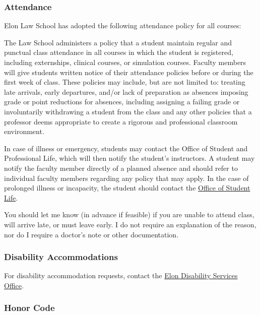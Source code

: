 \documentclass[11pt,letterpaper,twoside]{article}
\renewenvironment{quote}{%
   \list{}{%
     \leftmargin2em   %
     \rightmargin\leftmargin\parsep .1em }
   \item\relax
}
{\endlist}
\begin{document}
\subsubsection{Attendance}\label{attendance}

Elon Law School has adopted the following attendance policy for all
courses:

\begin{quote}
The Law School administers a policy that a student maintain regular and
punctual class attendance in all courses in which the student is
registered, including externships, clinical courses, or simulation
courses. Faculty members will give students written notice of their
attendance policies before or during the first week of class. These
policies may include, but are not limited to: treating late arrivals,
early departures, and/or lack of preparation as absences imposing grade
or point reductions for absences, including assigning a failing grade or
involuntarily withdrawing a student from the class and any other
policies that a professor deems appropriate to create a rigorous and
professional classroom environment.

In case of illness or emergency, students may contact the Office of
Student and Professional Life, which will then notify the student's
instructors. A student may notify the faculty member directly of a
planned absence and should refer to individual faculty members regarding
any policy that may apply. In the case of prolonged illness or
incapacity, the student should contact the
\href{https://www.elon.edu/u/law/students/}{Office of Student Life}.
\end{quote}

You should let me know (in advance if feasible) if you are unable to
attend class, will arrive late, or must leave early. I do not require an
explanation of the reason, nor do I require a doctor's note or other
documentation.

\subsubsection{Disability
Accommodations}\label{disability-accommodations}

For disability accommodation requests, contact the
\href{https://www.elon.edu/u/academics/koenigsberger-learning-center/disabilities-resources/homepage/graduate-student-resources/}{Elon
Disability Services Office}.

\subsubsection{Honor Code}\label{honor-code}
\end{document}
